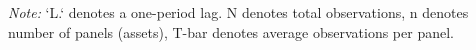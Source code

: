 \begin{threeparttable}
    \begin{tablenotes}
        \item \textit{Note:} `L.` denotes a one-period lag. N denotes total observations, n denotes number of panels (assets), T-bar denotes average observations per panel.
    \end{tablenotes}
\end{threeparttable}
